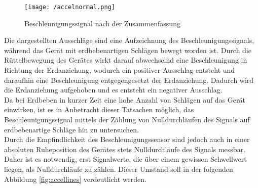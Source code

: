 \begin{figure}[H]
\centering
\texttt{[image: /accelnormal.png]}
\caption{Beschleunigungssignal nach der Zusammenfassung}
\label{fig:accelnormal}
\end{figure}
Die dargestellten Ausschläge sind eine Aufzeichnung des Beschleunigungssignals, während das Gerät mit erdbebenartigen Schlägen bewegt worden ist. Durch die Rüttelbewegung des Gerätes wirkt darauf abwechselnd eine Beschleunigung in Richtung der Erdanziehung, wodurch ein positiver Ausschlag entsteht und daraufhin eine Beschleunigung entgegengesetzt der Erdanziehung. Dadurch wird die Erdanziehung aufgehoben und es entsteht ein negativer Ausschlag.\\
Da bei Erdbeben in kurzer Zeit eine hohe Anzahl von Schlägen auf das Gerät einwirken, ist es in Anbetracht dieser Tatsachen möglich, das Beschleunigungssignal mittels der Zählung von Nulldurchläufen des Signals auf erdbebenartige Schläge hin zu untersuchen.\\
Durch die Empfindlichkeit des Beschleunigungssensor sind jedoch auch in einer absoluten Ruheposition des Gerätes stets Nulldurchläufe des Signals messbar. Daher ist es notwendig, erst Signalwerte, die über einem gewissen Schwellwert liegen, als Nulldurchläufe zu zählen.
Dieser Umstand soll in der folgenden Abbildung \ref{fig:accellines} verdeutlicht werden.

